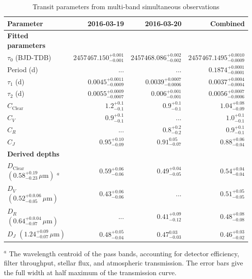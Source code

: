 \documentclass[apj]{emulateapj}
\begin{document}
\begin{table}
\centering
\caption{\label{tab:simultaneous_params}Transit parameters from multi-band simultaneous observations}
\begin{tabular}{lrrr}
\hline\hline
Parameter & 2016-03-19 & 2016-03-20 & Combined\\
\hline
\textbf{Fitted parameters} & & & \\
$\tau_0$ (BJD-TDB) & $2457467.150_{-0.001}^{+0.001}$ & $2457468.086_{-0.002}^{+0.002}$ & $2457467.1495_{-0.0009}^{+0.0010}$\\
Period (d) & ... & ... & $0.1874_{-0.0001}^{+0.0001}$ \\ 
$\tau_1$ (d) & $0.0045_{-0.0009}^{+0.0011}$ & $0.0039_{-0.0006}^{+0.0007}$ & $0.0037_{-0.0004}^{+0.0004}$ \\
$\tau_2$ (d) & $0.0055_{-0.0007}^{+0.0009}$ & $0.006_{-0.001}^{+0.001}$ & $0.0056_{-0.0006}^{+0.0007}$ \\
$C_\mathrm{Clear}$ & $1.2_{-0.1}^{+0.1}$ & $0.9_{-0.1}^{+0.1}$ & $1.04_{-0.09}^{+0.08}$ \\
$C_V$ & $0.9_{-0.1}^{+0.1}$ & ... & $1.0_{-0.1}^{+0.1}$\\
$C_R$ & ... & $0.8_{-0.2}^{+0.2}$ & $0.9_{-0.1}^{+0.1}$ \\
$C_J$ & $0.95_{-0.09}^{+0.10}$ & $0.91_{-0.07}^{0.05}$ & $0.88_{-0.04}^{+0.06}$ \\
\textbf{Derived depths} && \\
$D_\mathrm{Clear}$ $(0.58_{-0.23}^{+0.19}\,\mu\mathrm{m})$ $^a$ & $0.59_{-0.06}^{+0.06}$ & $0.49_{-0.05}^{+0.04}$ & $0.54_{-0.04}^{+0.04}$ \\
$D_V$ $(0.52_{-0.05}^{+0.0.06}\,\mu\mathrm{m})$& $0.43_{-0.06}^{+0.06}$  & ... & $0.51_{-0.05}^{+0.05}$\\
$D_R$ $(0.64_{-0.07}^{+0.0.04}\,\mu\mathrm{m})$& ... & $0.41_{-0.12}^{+0.09}$ & $0.48_{-0.08}^{+0.08}$\\
$D_J$ $(1.24_{-0.07}^{+0.09}\,\mu\mathrm{m})$ & $0.48_{-0.04}^{+0.05}$ & $0.47_{-0.03}^{0.03}$ & $0.46_{-0.02}^{+0.03}$\\
\hline
\end{tabular}
    \begin{flushleft}
    $^a$ The wavelength centroid of the pass bands, accounting for detector efficiency, filter throughput, stellar flux, and atmospheric transmission. The error bars give the full width at half maximum of the transmission curve.\\
    \end{flushleft}
\end{table}
\end{document}
